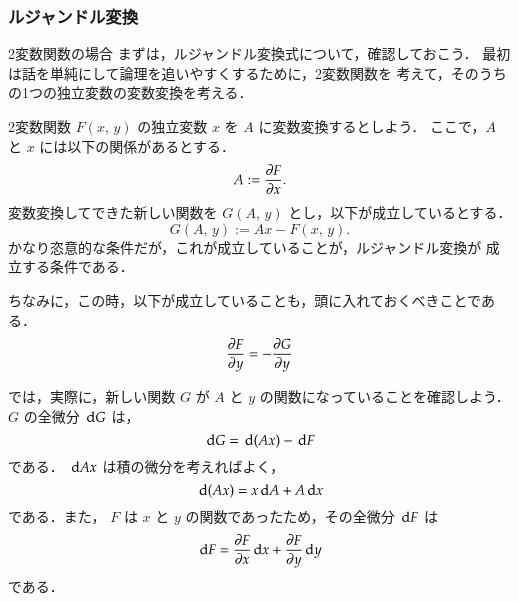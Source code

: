             \subsubsection{ルジャンドル変換}
                \begin{mysmallsec}{2変数関数の場合}
                    まずは，ルジャンドル変換式について，確認しておこう．
                    最初は話を単純にして論理を追いやすくするために，2変数関数を
                    考えて，そのうちの1つの独立変数の変数変換を考える．

                    2変数関数 $F(x,\,y)$ の独立変数 $x$ を $A$ に変数変換するとしよう．
                    ここで，$A$ と $x$ には以下の関係があるとする．
                        \begin{equation*}
                            A := \frac{\partial F}{\partial x}.
                        \end{equation*}
                    変数変換してできた新しい関数を $G(A,\,y)$ とし，以下が成立しているとする．
                        \begin{equation*}
                            G(A,\,y) := Ax - F(x,\,y).
                        \end{equation*}
                    かなり恣意的な条件だが，これが成立していることが，ルジャンドル変換が
                    成立する条件である．

                    ちなみに，この時，以下が成立していることも，頭に入れておくべきことである．
                        \begin{equation*}
                            \frac{\partial F}{\partial y} = - \frac{\partial G}{\partial y}
                        \end{equation*}


                    では，実際に，新しい関数 $G$ が $A$ と $y$ の関数になっていることを確認しよう．
                    $G$ の全微分 $\,\mathrm{d} G$ は，
                        \begin{equation*}
                            \,\mathrm{d} G = \,\mathrm{d} (Ax) - \,\mathrm{d} F
                        \end{equation*}
                    である．
                    $\,\mathrm{d} Ax$ は積の微分を考えればよく，
                        \begin{equation*}
                            \,\mathrm{d} (Ax) = x \,\mathrm{d} A + A \,\mathrm{d} x
                        \end{equation*}
                    である．また，
                    $F$ は $x$ と $y$ の関数であったため，その全微分 $\,\mathrm{d} F$ は
                        \begin{equation*}
                            \,\mathrm{d} F = \frac{\partial F}{\partial x} \,\mathrm{d} x +  \frac{\partial F}{\partial y} \,\mathrm{d} y
                        \end{equation*}
                    である．


\end{mysmallsec}
